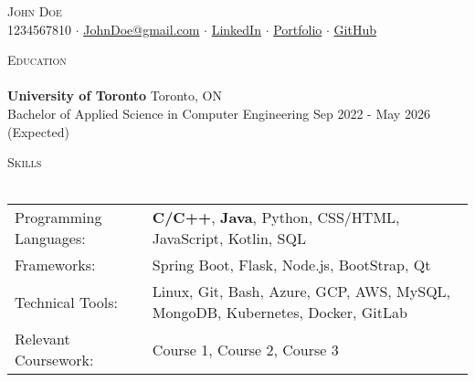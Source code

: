 \documentclass[a4paper]{article}
\newcommand{\lineunder} {
    \vspace*{-8pt} \\
    \hspace*{-18pt} \hrulefill \hspace*{-0.5cm} \\
}
\newcommand{\header} [1] {
    {\hspace*{-18pt}\vspace*{6pt} \textsc{#1}}
    \vspace*{-6pt} \lineunder
}
\begin{document}
\vspace*{-40pt}

    

\vspace*{-10pt}
\begin{center}
	{\Huge \scshape {John Doe}}\\
	1234567810 $\cdot$ \href{mailto:JohnDoe@gmail.com}{JohnDoe@gmail.com} $\cdot$ \href{https://www.google.com}{LinkedIn} $\cdot$ \href{https://www.google.com}{Portfolio} $\cdot$ \href{https://www.google.com}{GitHub}\\
\end{center}

\header{Education}
\textbf{University of Toronto} \hfill Toronto, ON \\
Bachelor of Applied Science in Computer Engineering \hfill Sep 2022 - May 2026 (Expected)\\
\vspace{2mm}

\header{Skills}
\noindent
\begin{tabular}{@{} p{4cm} p{14cm} @{}}
    Programming Languages: & \textbf{C/C++}, \textbf{Java}, Python, CSS/HTML, JavaScript, Kotlin, SQL            \\
    Frameworks: & Spring Boot, Flask, Node.js, BootStrap, Qt\\
    Technical Tools: & Linux, Git, Bash, Azure, GCP, AWS, MySQL, MongoDB, Kubernetes, Docker, GitLab       \\
 Relevant Coursework: &Course 1, Course 2, Course 3\\
\end{tabular}
\vspace{2mm}
\end{document}

